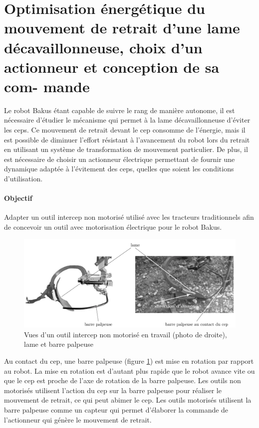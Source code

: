 
\section{Optimisation énergétique du mouvement de retrait d'une lame
décavaillonneuse, choix d'un actionneur et conception de sa com-
mande}

Le robot Bakus étant capable de suivre le rang de manière autonome, il est nécessaire d'étudier le mécanisme qui permet à la lame décavaillonneuse d'éviter les ceps. Ce mouvement de retrait devant le cep consomme de l'énergie, mais il est possible de diminuer l'effort résistant à l'avancement du robot lors du retrait en utilisant un système de transformation de mouvement particulier. De plus, il est nécessaire de choisir un actionneur électrique permettant de fournir une dynamique adaptée à l'évitement des ceps, quelles que soient les conditions d'utilisation.

\paragraph{Objectif}

Adapter un outil intercep non motorisé utilisé avec les tracteurs traditionnels afin de concevoir un outil avec motorisation électrique pour le robot Bakus.

\begin{figure}[!h]
\centering\includegraphics[width=0.8\linewidth]{img/fig05}
 \caption{Vues d'un outil intercep non motorisé en travail (photo de droite), lame et barre palpeuse}
 \label{img05}
\end{figure}

Au contact du cep, une barre palpeuse (figure \ref{img05}) est mise en rotation par rapport au robot. La mise en rotation est d'autant plus rapide que le robot avance vite ou que le cep est proche de l'axe de rotation de la barre palpeuse. Les outils non motorisés utilisent l'action du cep sur la barre palpeuse pour réaliser le mouvement de
retrait, ce qui peut abimer le cep. Les outils motorisés utilisent la barre palpeuse comme un capteur qui permet d'élaborer la commande de l'actionneur qui génère le mouvement de retrait.

